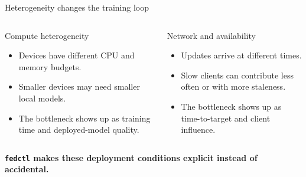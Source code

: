 \documentclass[aspectratio=169,xcolor=dvipsnames]{beamer}
\newcommand{\tightitems}{\setlength\itemsep{0.45em}}
\begin{document}
\begin{frame}{Heterogeneity changes the training loop}
    \begin{columns}[T,totalwidth=\textwidth]
        \begin{block}{Compute heterogeneity}
            \begin{itemize}
                \tightitems
                \item Devices have different CPU and memory budgets.
                \item Smaller devices may need smaller local models.
                \item The bottleneck shows up as training time and deployed-model quality.
            \end{itemize}
        \end{block}

        \begin{exampleblock}{Network and availability}
            \begin{itemize}
                \tightitems
                \item Updates arrive at different times.
                \item Slow clients can contribute less often or with more staleness.
                \item The bottleneck shows up as time-to-target and client influence.
            \end{itemize}
        \end{exampleblock}
    \end{columns}

    \vspace{1.0em}
    \centering
    \textbf{\texttt{fedctl} makes these deployment conditions explicit instead of accidental.}
\end{frame}
\end{document}
